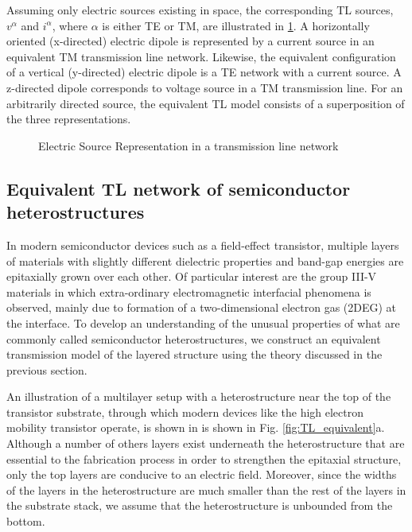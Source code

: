 \documentclass[12pt]{article}
\begin{document}
%
Assuming only electric sources existing in space, the corresponding TL sources, $v^{\alpha}$ and $i^{\alpha}$, where $\alpha$ is either TE or TM, are illustrated in \ref{fig:J_sources}. A horizontally oriented (x-directed) electric dipole is represented by a current source in an equivalent TM transmission line network. Likewise, the equivalent configuration of a vertical (y-directed) electric dipole is a TE network with a current source. A z-directed dipole corresponds to voltage source in a TM transmission line. For an arbitrarily directed source, the equivalent TL model consists of a superposition of the three representations.
%
\begin{figure}[h]
  \centering
    \newline
    \newline \centering
   \newline
  \caption{Electric Source Representation in a transmission line network}
  \label{fig:J_sources}
\end{figure}
\subsection{Equivalent TL network of semiconductor heterostructures}
%
In modern semiconductor devices such as a field-effect transistor, multiple layers of materials with slightly different dielectric properties and band-gap energies are epitaxially grown over each other. Of particular interest are the group III-V materials in which extra-ordinary electromagnetic interfacial phenomena is observed, mainly due to formation of a two-dimensional electron gas (2DEG) at the interface. To develop an understanding of the unusual properties of what are commonly called semiconductor heterostructures, we construct an equivalent transmission model of the layered structure using the theory discussed in the previous section.

An illustration of a multilayer setup with a heterostructure near the top of the transistor substrate, through which modern devices like the high electron mobility transistor operate, is shown in is shown in Fig. \ref{fig:TL_equivalent}a. Although a number of others layers exist underneath the heterostructure that are essential to the fabrication process in order to strengthen the epitaxial structure, only the top layers are conducive to an electric field. Moreover, since the widths of the layers in the heterostructure are much smaller than the rest of the layers in the substrate stack, we assume that the heterostructure is unbounded from the bottom.
\end{document}
